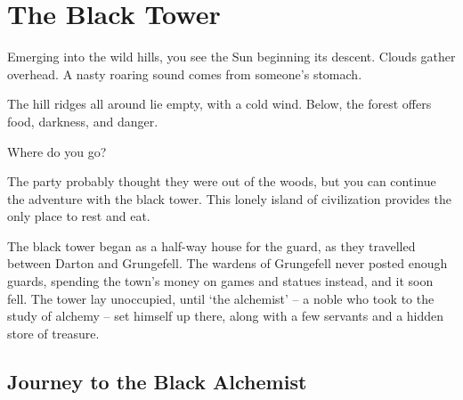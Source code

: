 \chapter{The Black Tower}
\epigraph{
  Emerging into the wild hills, you see the Sun beginning its descent.
  Clouds gather overhead.
  A nasty roaring sound comes from someone's stomach.

  The hill ridges all around lie empty, with a cold wind.
  Below, the forest offers food, darkness, and danger.

  Where do you go?
}{}

\begin{multicols}{2}

\noindent
The party probably thought they were out of the woods, but you can continue the adventure with the black tower.
This lonely island of civilization provides the only place to rest and eat.

\begin{exampletext}
  The black tower began as a half-way house for the \gls{guard}, as they travelled between Darton and Grungefell.
  The wardens of Grungefell never posted enough guards, spending the town's money on games and statues instead, and it soon fell.
  The tower lay unoccupied, until `the alchemist' -- a noble who took to the study of alchemy -- set himself up there, along with a few servants and a hidden store of treasure.
\end{exampletext}

\end{multicols}

\section{Journey to the Black Alchemist}

